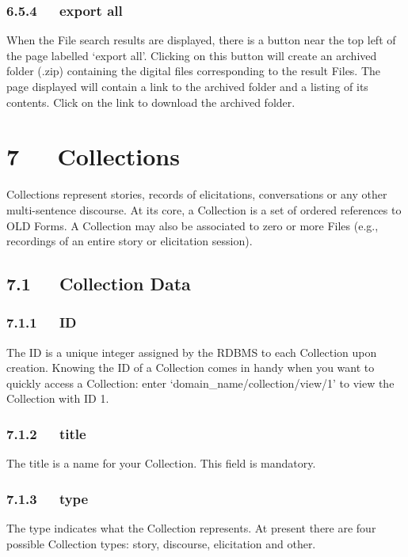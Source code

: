 \documentclass[letterpaper,10pt,english]{sphinxmanual}
\begin{document}
\subsection{6.5.4   export all}
\label{user_guide:id10}
When the File search results are displayed, there is a button near the top left
of the page labelled `export all'.  Clicking on this button will create an
archived folder (.zip) containing the digital files corresponding to the result
Files.  The page displayed will contain a link to the archived folder and a
listing of its contents.  Click on the link to download the archived folder.


\chapter{7   Collections}
\label{user_guide:collections}
Collections represent stories, records of elicitations, conversations or any
other multi-sentence discourse.  At its core, a Collection is a set of ordered
references to OLD Forms.  A Collection may also be associated to zero or more
Files (e.g., recordings of an entire story or elicitation session).


\section{7.1   Collection Data}
\label{user_guide:collection-data}

\subsection{7.1.1   ID}
\label{user_guide:id11}
The ID is a unique integer assigned by the RDBMS to each Collection upon
creation.  Knowing the ID of a Collection comes in handy when you want to
quickly access a Collection: enter `domain\_name/collection/view/1' to view the
Collection with ID 1.


\subsection{7.1.2   title}
\label{user_guide:title}
The title is a name for your Collection.  This field is mandatory.


\subsection{7.1.3   type}
\label{user_guide:type}
The type indicates what the Collection represents.  At present there are four
possible Collection types: story, discourse, elicitation and other.
\end{document}
